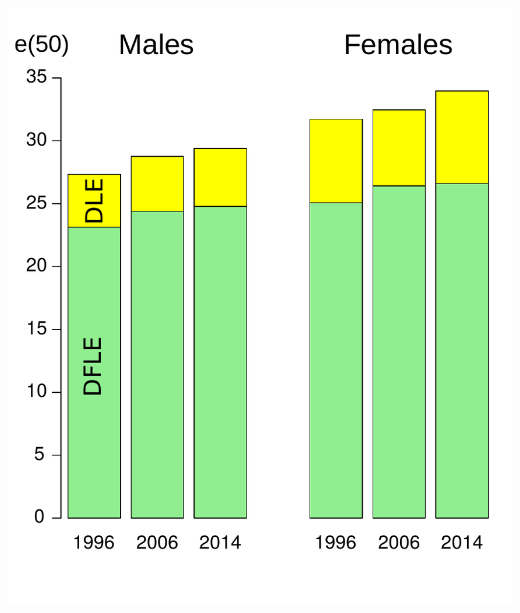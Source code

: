 \documentclass[20pt,usenames,dvipsnames]{beamer}
\begin{document}
\begin{frame}[plain]
\Large\begin{center}
\includegraphics[height=\textheight, keepaspectratio]{Figures/lemf_ink.pdf}
\end{center}
\end{frame}
\end{document}
